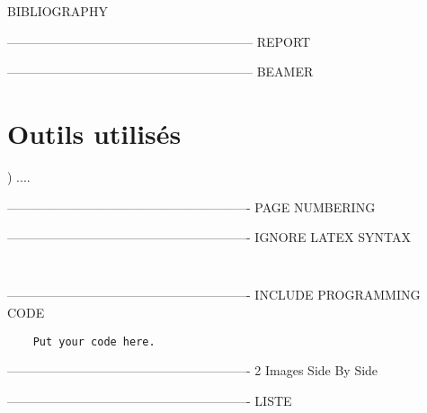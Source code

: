BIBLIOGRAPHY

\newpage
\nocite{*}
\printbibliography[heading=bibintoc]

-----------------------------------------------------------
REPORT


\newpage
\tableofcontents


-----------------------------------------------------------
BEAMER

\begin{frame}
\titlepage
\tableofcontents
\end{frame}

\usebackgroundtemplate{}
\section{Outils utilisés}
\begin{frame}{\thesection) \secname}
....
\end{frame}

----------------------------------------------------------
PAGE NUMBERING


----------------------------------------------------------
IGNORE LATEX SYNTAX

\begin{verbatim}
    
\end{verbatim}

----------------------------------------------------------
INCLUDE PROGRAMMING CODE

\begin{lstlisting}
    Put your code here.
\end{lstlisting}



----------------------------------------------------------
2 Images Side By Side

\begin{figure}%
\centering
{}%
\qquad
{}%
\end{figure}

----------------------------------------------------------
LISTE

